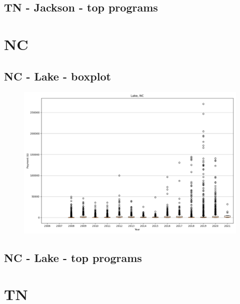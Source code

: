 \subsection*{TN - Jackson - top programs}

\newpage
\section*{NC}
\subsection*{NC - Lake - boxplot}
\begin{figure}[h]
\centering
\includegraphics[width=7in]{../output/boxplots/counties/Lake-NC_boxplot.png}
\end{figure}


\subsection*{NC - Lake - top programs}

\newpage
\section*{TN}
